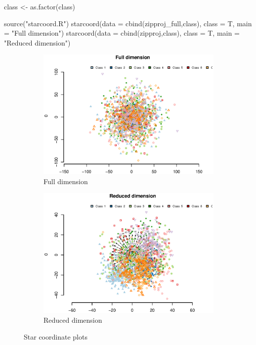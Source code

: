 \documentclass{article}
\begin{document}
\begin{enumerate}[leftmargin = 0 em, label = \arabic*., font = \bfseries]
\begin{enumerate}
\begin{enumerate}
\begin{rcode}
class <- as.factor(class)

source("starcoord.R")
starcoord(data = cbind(zipproj_full,class), class = T, main = "Full dimension")
starcoord(data = cbind(zipproj,class), class = T, main = "Reduced dimension")

		\end{rcode}

\begin{figure}[!htb]
    \centering
	\begin{subfigure}[b]{0.45\textwidth}
	\includegraphics[width = \textwidth]{star_full.eps}
	\caption{Full dimension}
	\end{subfigure}%
	\begin{subfigure}[b]{0.45\textwidth}
	\includegraphics[width = \textwidth]{star_reduced.eps}
	\caption{Reduced dimension}
	\end{subfigure}
	\caption{Star coordinate plots}
	\label{pca2}
\end{figure}


	\end{enumerate}
	
	

	\end{enumerate}

 	\end{enumerate}









	
	
	
	
\end{document}
